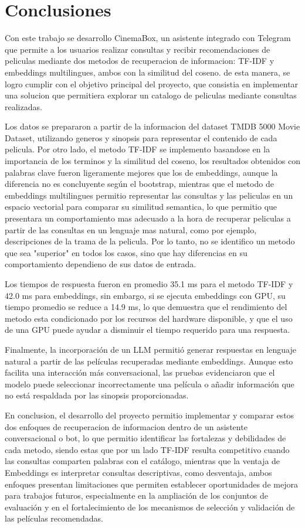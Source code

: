 ﻿\section{Conclusiones}\label{sec:conclusiones}

Con este trabajo se desarrollo CinemaBox, un asistente integrado con Telegram que permite a los usuarios realizar consultas y recibir recomendaciones de peliculas mediante dos metodos de recuperacion de informacion: TF-IDF y embeddings multilingues, ambos con la similitud del coseno. de esta manera, se logro cumplir con el objetivo principal del proyecto, que consistia en implementar una solucion que permitiera explorar un catalogo de peliculas mediante consultas realizadas.

Los datos se prepararon a partir de la informacion del dataset TMDB 5000 Movie Dataset, utilizando generos y sinopsis para representar el contenido de cada pelicula. Por otro lado, el metodo TF-IDF se implemento basandose en la importancia de los terminos y la similitud del coseno, los resultados obtenidos con palabras clave fueron ligeramente mejores que los de embeddings, aunque la diferencia no es concluyente según el bootstrap, mientras que el metodo de embeddings multilingues permitio representar las consultas y las peliculas en un espacio vectorial para comparar su similitud semantica, lo que permitio que presentara un comportamiento mas adecuado a la hora de recuperar peliculas a partir de las consultas en un lenguaje mas natural, como por ejemplo, descripciones de la trama de la pelicula. Por lo tanto, no se identifico un metodo que sea "superior" en todos los casos, sino que hay diferencias en su comportamiento dependieno de sus datos de entrada.

Los tiempos de respuesta fueron en promedio 35.1 ms para el metodo TF-IDF y 42.0 ms para embeddings, sin embargo, si se ejecuta embeddings con GPU, su tiempo promedio se reduce a 14.9 ms, lo que demuestra que el rendimiento del metodo esta condicionado por los recursos del hardware disponible, y que el uso de una GPU puede ayudar a disminuir el tiempo requerido para una respuesta.

Finalmente, la incorporación de un LLM permitió generar respuestas en lenguaje natural a partir de las películas recuperadas mediante embeddings. Aunque esto facilita una interacción más conversacional, las pruebas evidenciaron que el modelo puede seleccionar incorrectamente una película o añadir información que no está respaldada por las sinopsis proporcionadas.

En conclusion, el desarrollo del proyecto permitio implementar y comparar estos dos enfoques de recuperacion de informacion dentro de un asistente conversacional o bot, lo que permitio identificar las fortalezas y debilidades de cada metodo, siendo estas que por un lado TF-IDF resulta competitivo cuando las consultas comparten palabras con el catálogo, mientras que la ventaja de Embeddings es interpretar consultas descriptivas, como desventaja, ambos enfoques presentan limitaciones que permiten establecer oportunidades de mejora para trabajos futuros, especialmente en la ampliación de los conjuntos de evaluación y en el fortalecimiento de los mecanismos de selección y validación de las películas recomendadas.